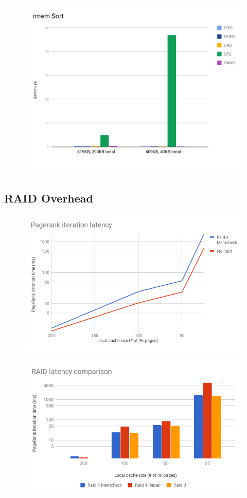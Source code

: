 \begin{figure}[H]
    \includegraphics[width=\columnwidth]{fig/sortPerformance}
    \caption{}
    \label{fig:sortPerformance}
\end{figure}

\subsection{RAID Overhead}

\begin{figure}[H]
    \includegraphics[width=\columnwidth]{fig/Raid4Overhead}
    \caption{}
    \label{fig:raid4Overhead}
\end{figure}

\begin{figure}[H]
    \includegraphics[width=\columnwidth]{fig/RaidComparison}
    \caption{}
    \label{fig:RaidComparison}
\end{figure}


